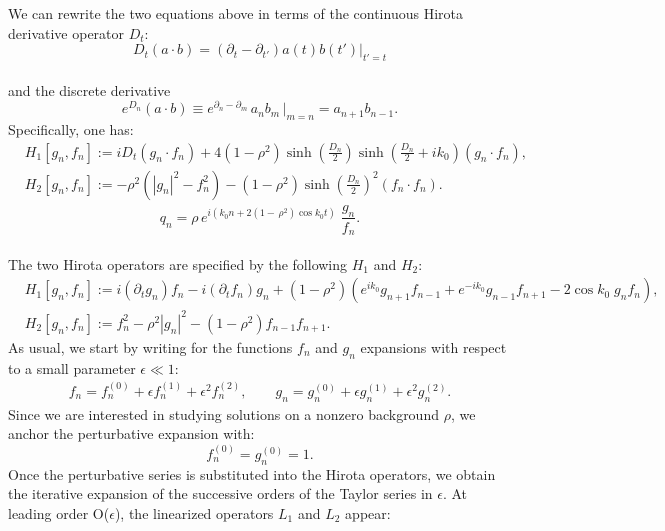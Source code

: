 \documentclass{article}
\begin{document}
We can rewrite the two equations above in terms of the continuous Hirota derivative operator $ D_t$:
\begin{equation}
    D_t(a\cdot b)=\left(\partial_t-\partial_{t'}\right)a(t)b(t')|_{t'=t}
\end{equation}\\
and the discrete derivative\\
\begin{equation}
 e^{D_n}(a\cdot b)\equiv  e^{\partial_n-\partial_{m}}\,a_nb_{m}\,|_{m=n}=a_{n+1}b_{n-1}.
\end{equation}
Specifically, one has:
\begin{equation}
\begin{split}
  &  H_1[g_n,f_n]:=iD_t(g_n\cdot f_n)+4(1-\rho^2)\sinh\left(\frac{D_n}{2}\right)\sinh\left(\frac{D_n}{2}+ik_0\right)( g_n\cdot f_n),\\[2mm]
   & H_2[g_n,f_n]:=-\rho^2\left(|g_n|^2-f_n^2\right)-(1-\rho^2)\sinh\left(\frac{D_n}{2}\right)^2(f_{n}\cdot f_{n}).
   \end{split}
\end{equation}
\begin{equation}\label{Hirota_sol_def}
    q_n=\rho\,e^{i(k_0 n+2(1-\,\rho^2)\cos  k_0 t)}\;\frac{g_n}{f_n}.
\end{equation}\\
The two Hirota operators are specified by the following $H_1$ and $H_2$:
\begin{equation}\label{Hirota_defocusing}
\begin{split}
  &  H_1[g_n,f_n]:=i(\partial_t g_n)f_n-i(\partial_t f_n)g_n +(1-\rho^2)(e^{ik_0} g_{n+1}f_{n-1}+e^{-ik_0} g_{n-1}f_{n+1} -2\cos k_0  \; g_nf_n),\\[2mm]
   & H_2[g_n,f_n]:=f_n^2-\rho^2|g_n|^2-(1-\rho^2)f_{n-1}f_{n+1}.
   \end{split}
\end{equation}
As usual, we start by writing for the functions $f_n$ and $g_n$ expansions with respect to a small parameter $\epsilon\ll 1$:
\begin{gather}
       f_n=f^{(0)}_n+\epsilon f^{(1)}_n+\epsilon^2 f^{(2)}_n, \qquad 
     g_n=g^{(0)}_n+\epsilon g^{(1)}_n+\epsilon^2 g^{(2)}_n.
\end{gather}
Since we are interested in studying solutions on a nonzero background $\rho$, we anchor the perturbative expansion with:
\begin{equation}
    f^{(0)}_n=g^{(0)}_n=1.
\end{equation}
Once the perturbative series is substituted into the Hirota operators, we obtain the iterative expansion of the successive orders of the Taylor series in $\epsilon$. At leading order O($\epsilon$), the linearized operators $L_1$ and $L_2$ appear:
\end{document}
